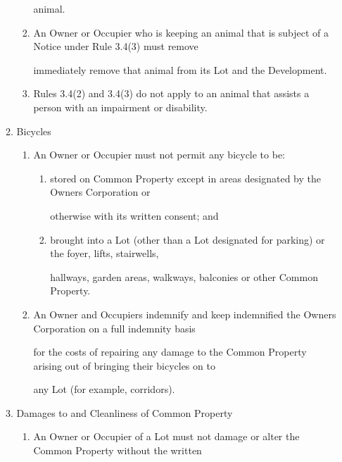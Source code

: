 \documentclass{article}
\begin{document}
\begin{enumerate}[label=\arabic*.]
\begin{enumerate}[label=\arabic{enumi}.\arabic*.]
\begin{enumerate}[label=(\arabic*)]
{\fontsize{10.02}{1}animal. }

\item {\fontsize{9.962}{1} An Owner or Occupier who is keeping an animal that is subject of a Notice under Rule 3.4(3) must remove }

{\fontsize{10.02}{1}immediately remove that animal from its Lot and the Development. }

\item {\fontsize{9.962}{1} Rules 3.4(2) and 3.4(3) do not apply to an animal that assists a person with an impairment or disability. }

\end{enumerate}
\item {\fontsize{9.99}{1} Bicycles }

\begin{enumerate}[label=(\arabic*)]
\item {\fontsize{9.962}{1} An Owner or Occupier must not permit any bicycle to be: }

\begin{enumerate}[label=(\alph*)]
\item {\fontsize{9.962}{1} stored on Common Property except in areas designated by the Owners Corporation or }

{\fontsize{10.02}{1}otherwise with its written consent; and }

\item {\fontsize{9.962}{1} brought into a Lot (other than a Lot designated for parking) or the foyer, lifts, stairwells, }

{\fontsize{10.02}{1}hallways, garden areas, walkways, balconies or other Common Property. }

\end{enumerate}
\item {\fontsize{9.962}{1} An Owner and Occupiers indemnify and keep indemnified the Owners Corporation on a full indemnity basis }

{\fontsize{10.02}{1}for the costs of repairing any damage to the Common Property arising out of bringing their bicycles on to }

{\fontsize{10.02}{1}any Lot (for example, corridors). }

\end{enumerate}
\item {\fontsize{9.99}{1} Damages to and Cleanliness of Common Property }

\begin{enumerate}[label=(\arabic*)]
\item {\fontsize{9.962}{1} An Owner or Occupier of a Lot must not damage or alter the Common Property without the written }


\end{enumerate}
\end{enumerate}
\end{enumerate}
\end{document}
